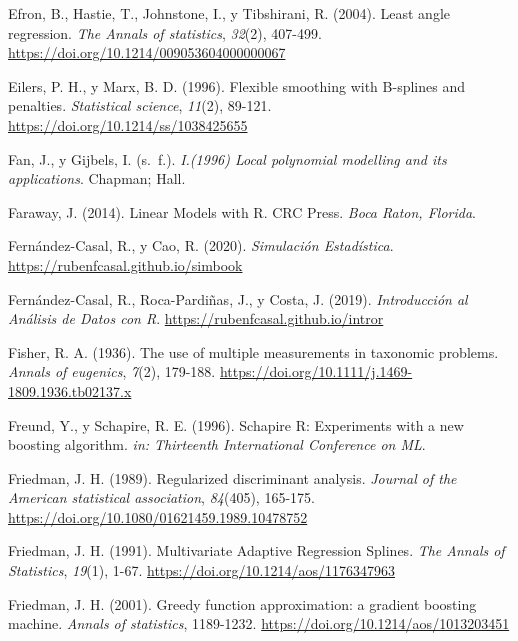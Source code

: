 \documentclass[
  spanish,
]{book}
\theoremstyle{break}
\theoremstyle{definition}
\theoremstyle{definition}
\theoremstyle{definition}
\theoremstyle{remark}
\begin{document}
\leavevmode\hypertarget{ref-efron2004least}{}%
Efron, B., Hastie, T., Johnstone, I., y Tibshirani, R. (2004). Least angle regression. \emph{The Annals of statistics}, \emph{32}(2), 407-499. \url{https://doi.org/10.1214/009053604000000067}

\leavevmode\hypertarget{ref-eilers1996flexible}{}%
Eilers, P. H., y Marx, B. D. (1996). Flexible smoothing with B-splines and penalties. \emph{Statistical science}, \emph{11}(2), 89-121. \url{https://doi.org/10.1214/ss/1038425655}

\leavevmode\hypertarget{ref-fan1996}{}%
Fan, J., y Gijbels, I. (s.~f.). \emph{I.(1996) Local polynomial modelling and its applications}. Chapman; Hall.

\leavevmode\hypertarget{ref-faraway2014linear}{}%
Faraway, J. (2014). Linear Models with R. CRC Press. \emph{Boca Raton, Florida}.

\leavevmode\hypertarget{ref-fernandez2020simbook}{}%
Fernández-Casal, R., y Cao, R. (2020). \emph{Simulación Estadística}. \url{https://rubenfcasal.github.io/simbook}

\leavevmode\hypertarget{ref-fernandez2019intror}{}%
Fernández-Casal, R., Roca-Pardiñas, J., y Costa, J. (2019). \emph{Introducción al Análisis de Datos con R}. \url{https://rubenfcasal.github.io/intror}

\leavevmode\hypertarget{ref-fisher1936use}{}%
Fisher, R. A. (1936). The use of multiple measurements in taxonomic problems. \emph{Annals of eugenics}, \emph{7}(2), 179-188. \url{https://doi.org/10.1111/j.1469-1809.1936.tb02137.x}

\leavevmode\hypertarget{ref-freund1996schapire}{}%
Freund, Y., y Schapire, R. E. (1996). Schapire R: Experiments with a new boosting algorithm. \emph{in: Thirteenth International Conference on ML}.

\leavevmode\hypertarget{ref-friedman1989regularized}{}%
Friedman, J. H. (1989). Regularized discriminant analysis. \emph{Journal of the American statistical association}, \emph{84}(405), 165-175. \url{https://doi.org/10.1080/01621459.1989.10478752}

\leavevmode\hypertarget{ref-friedman1991multivariate}{}%
Friedman, J. H. (1991). Multivariate Adaptive Regression Splines. \emph{The Annals of Statistics}, \emph{19}(1), 1-67. \url{https://doi.org/10.1214/aos/1176347963}

\leavevmode\hypertarget{ref-friedman2001greedy}{}%
Friedman, J. H. (2001). Greedy function approximation: a gradient boosting machine. \emph{Annals of statistics}, 1189-1232. \url{https://doi.org/10.1214/aos/1013203451}
\end{document}
